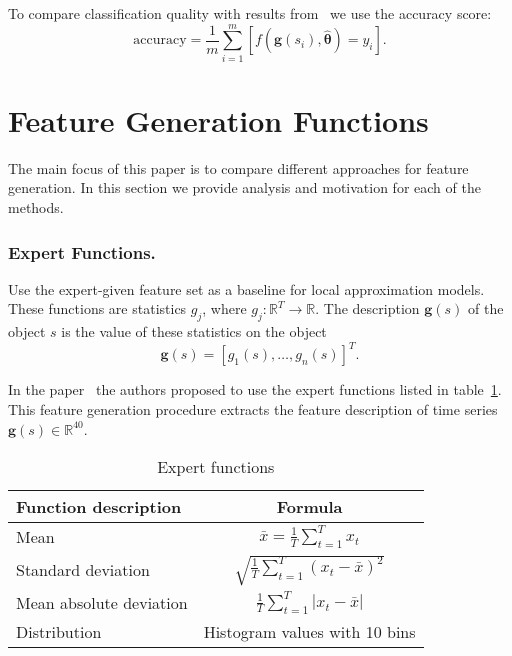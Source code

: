 \documentclass[a4paper,12pt]{article}
\begin{document}
To compare classification quality with results from~\cite{karasikov2016feature,ivkin2015ts} we use the accuracy score:
\begin{equation}
	\mathrm{accuracy} = \frac{1}{m} \sum_{i=1}^{m} \left[f\left(\boldsymbol{g}(s_i), \hat{\boldsymbol{\theta}} \right)= y_i\right].
	\label{eq::accuracy}
\end{equation}

\section{Feature Generation Functions}

The main focus of this paper is to compare different approaches for feature generation. 
In this section we provide analysis and motivation for each of the methods.

\subsubsection{Expert Functions.}

Use the expert-given feature set as a baseline for local approximation models.
These functions are statistics $g_j$, where $g_j: \mathbb{R}^T \rightarrow \mathbb{R}$.
The description $\boldsymbol{g}(s)$ of the object $s$ is the value of these statistics on the object 
\[
\boldsymbol{g}(s) = [g_1(s), \dots, g_n(s)]^{T}.
\]

In the paper~\cite{kwapisz2011activity} the authors proposed to use the expert functions listed in table~\ref{tbl::expert_functions}.
This feature generation procedure extracts the feature description of time series $\boldsymbol{g}(s) \in \mathbb{R}^{40}$.

\begin{table}[h]
	\centering
	\caption{Expert functions}
	\begin{tabular}{|l|c|}
		\hline
		\textbf{Function description}    & \textbf{Formula} \\ \hline
		Mean                    & $\bar{x} = \frac{1}{T} \sum_{t=1}^{T} x_t$    \\ \hline
		Standard deviation      & $\sqrt{\frac{1}{T} \sum_{t=1}^{T} (x_t - \bar{x})^2}$    \\ \hline
		Mean absolute deviation & $\frac{1}{T} \sum_{t=1}^{T} |x_t - \bar{x}|$    \\ \hline
		Distribution            &  Histogram values with 10 bins    \\ \hline
	\end{tabular}
	\label{tbl::expert_functions}
\end{table}
\end{document}

